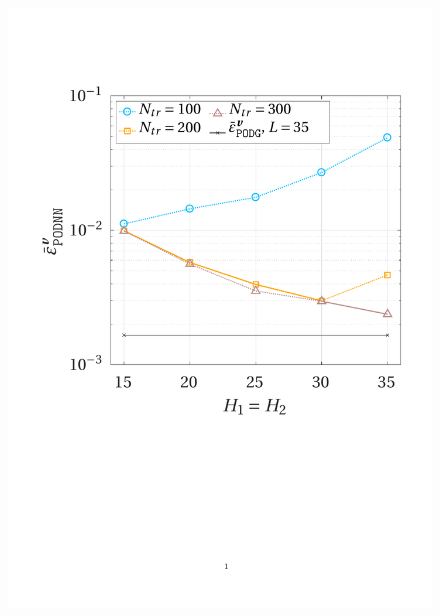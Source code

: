 \documentclass[12pt, a4paper, twoside, openright]{report}
\numberwithin{equation}{chapter}
\theoremstyle{theorem}
\theoremstyle{definition}
\theoremstyle{remark}
\theoremstyle{proposition}
\numberwithin{figure}{chapter}
\begin{document}
		\begin{figure}[H]
			\center
			\includegraphics[scale = 0.43, trim = {1.5cm 9cm 1.5cm 3.5cm}, clip]{dc_200_vel_nn_convergence}

\end{figure}
\end{document}

